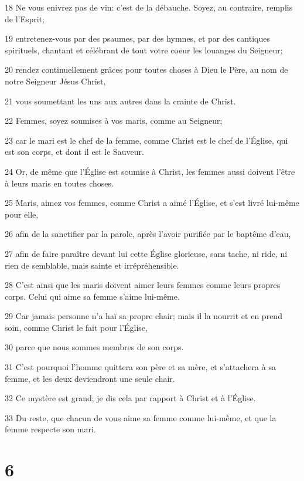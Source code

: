 \par 18 Ne vous enivrez pas de vin: c'est de la débauche. Soyez, au contraire, remplis de l'Esprit;
\par 19 entretenez-vous par des psaumes, par des hymnes, et par des cantiques spirituels, chantant et célébrant de tout votre coeur les louanges du Seigneur;
\par 20 rendez continuellement grâces pour toutes choses à Dieu le Père, au nom de notre Seigneur Jésus Christ,
\par 21 vous soumettant les uns aux autres dans la crainte de Christ.
\par 22 Femmes, soyez soumises à vos maris, comme au Seigneur;
\par 23 car le mari est le chef de la femme, comme Christ est le chef de l'Église, qui est son corps, et dont il est le Sauveur.
\par 24 Or, de même que l'Église est soumise à Christ, les femmes aussi doivent l'être à leurs maris en toutes choses.
\par 25 Maris, aimez vos femmes, comme Christ a aimé l'Église, et s'est livré lui-même pour elle,
\par 26 afin de la sanctifier par la parole, après l'avoir purifiée par le baptême d'eau,
\par 27 afin de faire paraître devant lui cette Église glorieuse, sans tache, ni ride, ni rien de semblable, mais sainte et irrépréhensible.
\par 28 C'est ainsi que les maris doivent aimer leurs femmes comme leurs propres corps. Celui qui aime sa femme s'aime lui-même.
\par 29 Car jamais personne n'a haï sa propre chair; mais il la nourrit et en prend soin, comme Christ le fait pour l'Église,
\par 30 parce que nous sommes membres de son corps.
\par 31 C'est pourquoi l'homme quittera son père et sa mère, et s'attachera à sa femme, et les deux deviendront une seule chair.
\par 32 Ce mystère est grand; je dis cela par rapport à Christ et à l'Église.
\par 33 Du reste, que chacun de vous aime sa femme comme lui-même, et que la femme respecte son mari.

\chapter{6}

